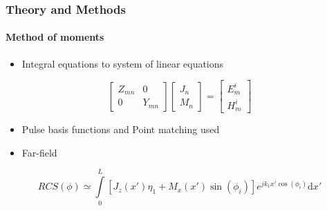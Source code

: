 \documentclass[mathserif,16pt,xcolor=table]{beamer}
\begin{document}
      \begin{frame}
        \frametitle{Theory and Methods}
        \framesubtitle{Method of moments}
        \begin{itemize}
          \item {Integral equations to system of linear equations}
        \end{itemize}
        \[
        \begin{bmatrix}
          Z_{mn}   & 0 \\
          0        & Y_{mn}
        \end{bmatrix}
        \begin{bmatrix}
          J_n \\
          M_n
        \end{bmatrix}
        =
        \begin{bmatrix}
          E_m^i \\
          H_m^i
        \end{bmatrix}
        \]
        \begin{itemize}
          \item {Pulse basis functions and Point matching used}
          \item {Far-field}
        \end{itemize}
        \begin{equation} \nonumber
        RCS({\phi}) \simeq \int \limits_{0}^{L} \left[J_z(x')\eta_1 + M_x(x')\sin(\phi_i)\right] e^{j k_1 x' \cos(\phi_i)} \mathrm{d}x'
        \label{eq:far-field}
      \end{equation}
      \end{frame}
\end{document}
